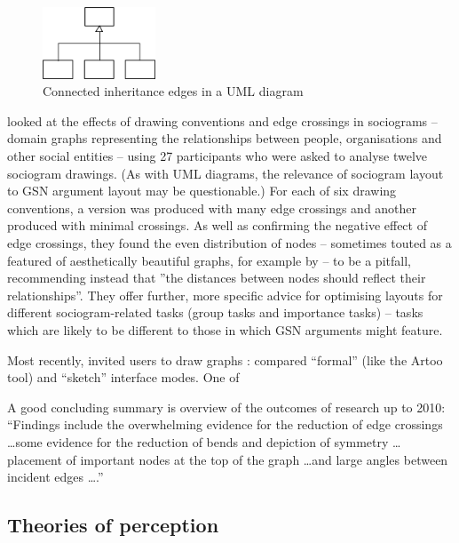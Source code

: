 \begin{figure}
  \centering
  \includegraphics[width=0.3\textwidth]{graphics/connected-inheritance-edges.png}
  \caption{Connected inheritance edges in a UML diagram \cite{kennysun}}
  \label{fig:connectededges}
\end{figure}


\citet{huang2007effects} looked at the effects of drawing conventions and edge crossings in sociograms -- domain graphs representing the relationships between people, organisations and other social entities -- using 27 participants who were asked to analyse twelve sociogram drawings. (As with UML diagrams, the relevance of sociogram layout to GSN argument layout may be questionable.) For each of six drawing conventions, a version was produced with many edge crossings and another produced with minimal crossings. As well as confirming the negative effect of edge crossings, they found the even distribution of nodes -- sometimes touted as a featured of aesthetically beautiful graphs, for example by \citet{SPE:SPE4380211102} -- to be a pitfall, recommending instead that ''the distances between nodes should reflect their relationships''. They offer further, more specific advice for optimising layouts for different sociogram-related tasks (group tasks and importance tasks) -- tasks which are likely to be different to those in which GSN arguments might feature.

Most recently, \citet{5674033} invited users to draw graphs :
compared ``formal'' (like the Artoo tool) and ``sketch'' interface modes.
One of

A good concluding summary is \citet{CRPITV106P80-88} overview of the outcomes of research up to 2010: ``Findings include
the overwhelming evidence for the reduction of edge
crossings \ldots some evidence for the reduction of
bends and depiction of symmetry \ldots
placement of important nodes at the top of the graph
\ldots and large angles between incident
edges \ldots.''

\subsection{Theories of perception \label{sec:gestalt}}

